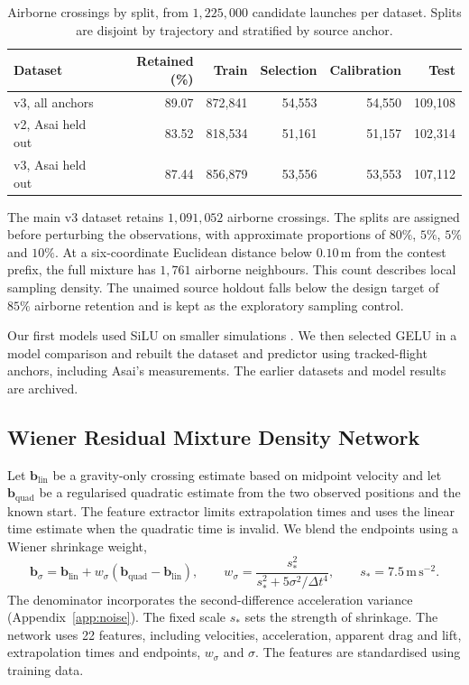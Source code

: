\documentclass[11pt,a4paper]{article}
\begin{document}
\begin{table}[htbp]
  \centering
  \small
  \caption{Airborne crossings by split, from $1{,}225{,}000$ candidate launches per dataset. Splits are disjoint by trajectory and stratified by source anchor.}
  \label{tab:splits}
  \begin{tabular}{lrrrrr}
    \toprule
    Dataset & Retained (\%) & Train & Selection & Calibration & Test \\
    \midrule
    v3, all anchors & 89.07 & 872,841 & 54,553 & 54,550 & 109,108 \\
    v2, Asai held out & 83.52 & 818,534 & 51,161 & 51,157 & 102,314 \\
    v3, Asai held out & 87.44 & 856,879 & 53,556 & 53,553 & 107,112 \\
    \bottomrule
  \end{tabular}
\end{table}

The main v3 dataset retains $1{,}091{,}052$ airborne crossings. The splits are assigned before perturbing the observations, with approximate proportions of $80\%$, $5\%$, $5\%$ and $10\%$. At a six-coordinate Euclidean distance below $0.10\,\mathrm{m}$ from the contest prefix, the full mixture has $1{,}761$ airborne neighbours. This count describes local sampling density. The unaimed source holdout falls below the design target of $85\%$ airborne retention and is kept as the exploratory sampling control.

Our first models used SiLU on smaller simulations \cite{silu2018}. We then selected GELU in a model comparison and rebuilt the dataset and predictor using tracked-flight anchors, including Asai's measurements. The earlier datasets and model results are archived.

\subsection{Wiener Residual Mixture Density Network}
\label{sec:mdn}

Let $\mathbf b_{\mathrm{lin}}$ be a gravity-only crossing estimate based on midpoint velocity and let $\mathbf b_{\mathrm{quad}}$ be a regularised quadratic estimate from the two observed positions and the known start. The feature extractor limits extrapolation times and uses the linear time estimate when the quadratic time is invalid. We blend the endpoints using a Wiener shrinkage weight,
\begin{equation}
  \mathbf b_\sigma=\mathbf b_{\mathrm{lin}}+w_\sigma
     (\mathbf b_{\mathrm{quad}}-\mathbf b_{\mathrm{lin}}),\qquad
  w_\sigma=\frac{s_*^2}{s_*^2+5\sigma^2/\Delta t^4},\qquad
  s_*=7.5\,\mathrm{m\,s^{-2}} .
\end{equation}
The denominator incorporates the second-difference acceleration variance (Appendix~\ref{app:noise}). The fixed scale $s_*$ sets the strength of shrinkage. The network uses 22 features, including velocities, acceleration, apparent drag and lift, extrapolation times and endpoints, $w_\sigma$ and $\sigma$. The features are standardised using training data.
\end{document}

